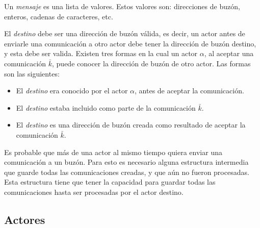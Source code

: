 Un \textit{mensaje} es una lista de valores. Estos valores son: direcciones de buzón, enteros, cadenas de caracteres, etc. 

El \textit{destino} debe ser una dirección de buzón válida, es decir, un actor antes de enviarle una comunicación a otro actor debe tener la dirección de buzón destino, y esta debe ser valida. Existen tres formas en la cual un actor $\alpha$, al aceptar una comunicación $\bar{k}$, puede conocer la dirección de buzón de otro actor. Las formas son las siguientes:

\begin{itemize}
 \item El \textit{destino} era conocido por el actor $\alpha$, antes de aceptar la comunicación.
 \item El \textit{destino} estaba incluido como parte de la comunicación $\bar{k}$.
 \item El \textit{destino} es una dirección de buzón creada como resultado de aceptar la comunicación $\bar{k}$.
\end{itemize}

Es probable que más de una actor al mismo tiempo quiera enviar una comunicación a un buzón. Para esto es necesario alguna estructura intermedia que guarde todas las comunicaciones creadas, y que aún no fueron procesadas. Esta estructura tiene que tener la capacidad para guardar todas las comunicaciones hasta ser procesadas por el actor destino. 



\subsection{Actores}

